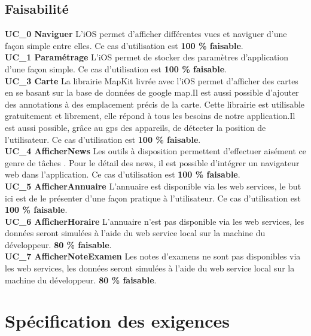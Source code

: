 	\subsection{Faisabilité}
		\textbf{UC\_0  Naviguer}  L'\gls{iOS} permet d'afficher différentes vues et naviguer d'une façon simple entre elles. Ce cas d'utilisation est \textbf{100 \%  faisable}.\\[0.2cm]
		\textbf{UC\_1  Paramétrage}  L'\gls{iOS} permet de stocker des paramètres d'application d'une façon simple. Ce cas d'utilisation est \textbf{100 \%  faisable}.\\[0.2cm]
		\textbf{UC\_3  Carte}  La librairie MapKit livrée avec l'\gls{iOS} permet d'afficher des cartes en se basant sur la base de données de google map.Il est aussi possible d'ajouter des annotations à des emplacement précis de la carte. Cette librairie est utilisable gratuitement et librement, elle répond à tous les besoins de notre application.Il est aussi possible, grâce au gps des appareils, de détecter la position de l'utilisateur.  Ce cas d'utilisation est \textbf{100 \%  faisable}.\\[0.2cm]
		\textbf{UC\_4  AfficherNews}  Les outils à disposition permettent d'effectuer aisément ce genre de tâches . Pour le détail des news, il est possible d'intégrer un navigateur web dans l'application. Ce cas d'utilisation est \textbf{100 \%  faisable}.\\[0.2cm]
		\textbf{UC\_5 AfficherAnnuaire}  L'annuaire est disponible via les web services, le but ici est de le présenter d'une façon pratique à l'utilisateur. Ce cas d'utilisation est \textbf{100 \%  faisable}.\\[0.2cm]
		\textbf{UC\_6 AfficherHoraire}  L'annuaire n'est pas disponible via les web services, les données seront simulées à l'aide du web service local	sur la machine du développeur. \textbf{80 \%  faisable}.\\[0.2cm]
		\textbf{UC\_7 AfficherNoteExamen}   Les notes d'examens ne sont pas disponibles via les web services, les données seront simulées à l'aide du web service local sur la machine du développeur. \textbf{80 \%  faisable}.\\[0.2cm]
		
\section{Spécification des exigences }

